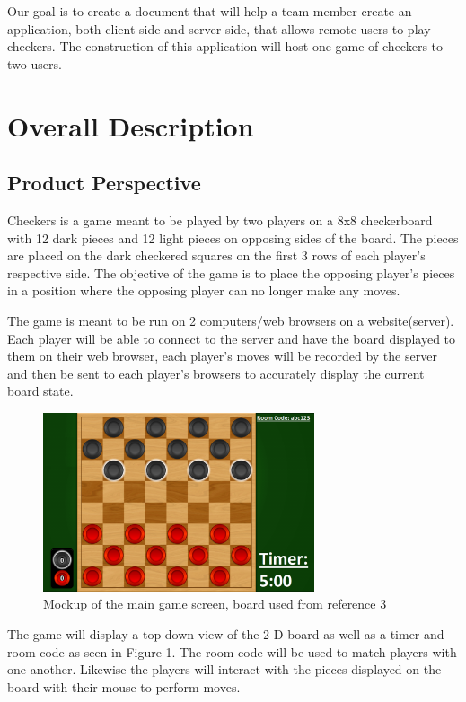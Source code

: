 \documentclass[10pt]{article}
\begin{document}
Our goal is to create a document that will help a team member create an application, 
both client-side and server-side, that allows remote users to play checkers. The construction of this application will host one game of checkers to two users. 
\section{Overall Description}

\subsection{Product Perspective}

\indent \indent Checkers is a game meant to be played by two players on a 8x8 checkerboard with 12 dark pieces and 12 light pieces on opposing sides of the board. The pieces are placed on the dark checkered squares on the first 3 rows of each player's respective side. The objective of the game is to place the opposing player’s pieces in a position where the opposing player can no longer make any moves.

\indent The game is meant to be run on 2 computers/web browsers on a website(server). Each player will be able to connect to the server and have the board displayed to them on their web browser, each player's moves will be recorded by the server and then be sent to each player's browsers to accurately display the current board state. 

\begin{figure}[h!]
    \centering
    \includegraphics[width=8cm]{Mockup Game Screen.png}
    \caption{Mockup of the main game screen, board used from reference 3}
\end{figure}

\indent The game will display a top down view of the 2-D board as well as a timer and room code as seen in Figure 1. The room code will be used to match players with one another. Likewise the players will interact with the pieces displayed on the board with their mouse to perform moves.
\end{document}
